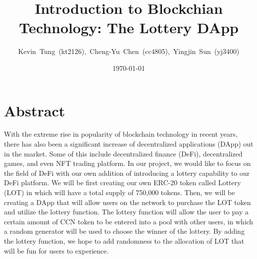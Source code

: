 \documentclass[11pt]{article}
\title{Introduction to Blockchian Technology: The Lottery DApp} %
\author{Kevin~Tung~(kt2126),~Cheng-Yu~Chen~(cc4805),~Yingjin~Sun~(yj3400)} %
\date{\today} %
\begin{document}
\maketitle
\section*{Abstract}
With the extreme rise in popularity of blockchain technology in recent years, there has also been a significant increase of decentralized applications (DApp) out in the market. Some of this include decentralized finance (DeFi), decentralized games, and even NFT trading platform. In our project, we would like to focus on the field of DeFi with our own addition of introducing a lottery capability to our DeFi platform. We will be first creating our own ERC-20 token called Lottery (LOT) in which will have a total supply of 750,000 tokens. Then, we will be creating a DApp that will allow users on the network to purchase the LOT token and utilize the lottery function. The lottery function will allow the user to pay a certain amount of CCN token to be entered into a pool with other users, in which a random generator will be used to choose the winner of the lottery. By adding the lottery function, we hope to add randomness to the allocation of LOT that will be fun for users to experience.
\end{document}
